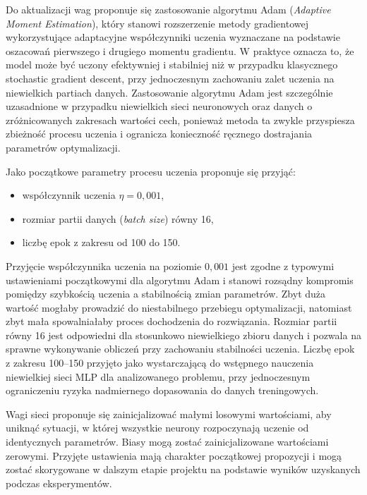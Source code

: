 Do aktualizacji wag proponuje się zastosowanie algorytmu Adam (\textit{Adaptive Moment Estimation}), który stanowi rozszerzenie metody gradientowej wykorzystujące adaptacyjne współczynniki uczenia wyznaczane na podstawie oszacowań pierwszego i drugiego momentu gradientu. W praktyce oznacza to, że model może być uczony efektywniej i stabilniej niż w przypadku klasycznego stochastic  gradient descent, przy jednoczesnym zachowaniu zalet uczenia na niewielkich partiach danych. Zastosowanie algorytmu Adam jest szczególnie uzasadnione w przypadku niewielkich sieci neuronowych oraz danych o zróżnicowanych zakresach wartości cech, ponieważ metoda ta zwykle przyspiesza zbieżność procesu uczenia i ogranicza konieczność ręcznego dostrajania parametrów optymalizacji.

Jako początkowe parametry procesu uczenia proponuje się przyjąć:
\begin{itemize}
    \item współczynnik uczenia $\eta = 0{,}001$,
    \item rozmiar partii danych (\textit{batch size}) równy 16,
    \item liczbę epok z zakresu od 100 do 150.
\end{itemize}

Przyjęcie współczynnika uczenia na poziomie $0{,}001$ jest zgodne z typowymi ustawieniami początkowymi dla algorytmu Adam i stanowi rozsądny kompromis pomiędzy szybkością uczenia a stabilnością zmian parametrów. Zbyt duża wartość mogłaby prowadzić do niestabilnego przebiegu optymalizacji, natomiast zbyt mała spowalniałaby proces dochodzenia do rozwiązania. Rozmiar partii równy 16 jest odpowiedni dla stosunkowo niewielkiego zbioru danych i pozwala na sprawne wykonywanie obliczeń przy zachowaniu stabilności uczenia. Liczbę epok z zakresu 100--150 przyjęto jako wystarczającą do wstępnego nauczenia niewielkiej sieci MLP dla analizowanego problemu, przy jednoczesnym ograniczeniu ryzyka nadmiernego dopasowania do danych treningowych.

Wagi sieci proponuje się zainicjalizować małymi losowymi wartościami, aby uniknąć sytuacji, w której wszystkie neurony rozpoczynają uczenie od identycznych parametrów. Biasy mogą zostać zainicjalizowane wartościami zerowymi. Przyjęte ustawienia mają charakter początkowej propozycji i mogą zostać skorygowane w dalszym etapie projektu na podstawie wyników uzyskanych podczas eksperymentów.